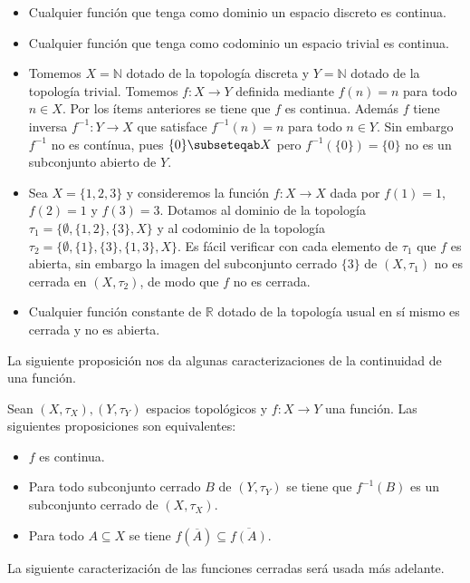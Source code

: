 \begin{Ejm}\label{Ejm:funciones_continuas}
   \phantom{o}
   \begin{itemize}
      \item Cualquier función que tenga como dominio un espacio discreto es continua.
      \item Cualquier función que tenga como codominio un espacio trivial es continua.
      \item Tomemos $X=\mathbb{N}$ dotado de la topología discreta y $Y=\mathbb{N}$ dotado de la topología trivial. Tomemos $f:X\to Y$ definida mediante $f(n)=n$ para todo $n\in X$. Por los ítems anteriores se tiene que $f$ es continua. Además $f$ tiene inversa $f^{-1}:Y\to X$ que satisface $f^{-1}(n)=n$ para todo $n\in Y$. Sin embargo $f^{-1}$ no es contínua, pues $\{0\}\subseteqab X$ pero $f^{-1}(\{0\})=\{0\}$ no es un subconjunto abierto de $Y$.   
      \item Sea $X = \{1, 2, 3\}$ y consideremos la función $f: X \to X$ dada por $f(1) = 1$, $f(2) = 1$ y $f(3) = 3$. Dotamos al dominio de la topología $\tau_1 = \{\emptyset, \{1, 2\}, \{3\}, X\}$ y al codominio de la topología $\tau_2 = \{\emptyset, \{1\}, \{3\}, \{1, 3\}, X\}$. Es fácil verificar con cada elemento de $\tau_1$ que $f$ es abierta, sin embargo la imagen del subconjunto cerrado $\{3\}$ de $(X,\tau_1)$ no es cerrada en $(X,\tau_2)$, de modo que $f$ no es cerrada.
      \item Cualquier función constante de $\mathbb{R}$ dotado de la topología usual en sí mismo es cerrada y no es abierta.
   \end{itemize}
\end{Ejm}
La siguiente proposición nos da algunas caracterizaciones de la continuidad de una función.
\begin{Prop}
   Sean $(X,\tau_X), (Y,\tau_Y)$ espacios topológicos y $f:X\to Y$ una función. Las siguientes proposiciones son equivalentes:
   \begin{itemize}
      \item[1.] $f$ es continua.
      \item[2.] Para todo subconjunto cerrado $B$ de $(Y,\tau_Y)$ se tiene que $f^{-1}(B)$ es un subconjunto cerrado de $(X,\tau_X)$.
      \item[3.] Para todo $A\subseteq X$ se tiene $f(\overline{A})\subseteq\overline{f(A)}$.
   \end{itemize}
\end{Prop}
La siguiente caracterización de las funciones cerradas será usada más adelante.
